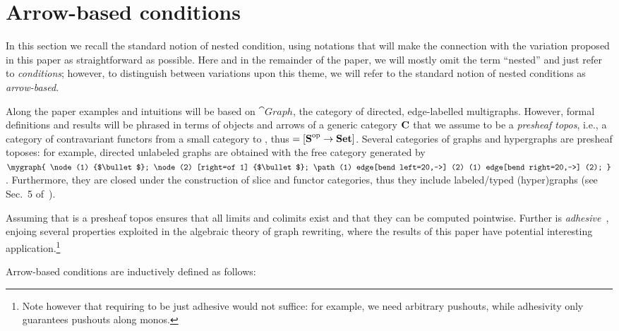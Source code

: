 \section{Arrow-based conditions}

In this section we recall the standard notion of nested condition, using notations that will make the connection with the variation proposed in this paper as straightforward as possible. Here and in the remainder of the paper, we will mostly omit the term ``nested'' and just refer to \emph{conditions}; however, to distinguish between variations upon this theme, we will refer to the standard notion of nested conditions as \emph{arrow-based}.

Along the paper examples and intuitions will be based on $\cat{Graph}$, the category of directed, edge-labelled multigraphs. However, formal definitions and results will be phrased in terms of objects and arrows of a generic category $\mathbf{C}$ that we assume to be a \emph{presheaf topos}, i.e., a category of contravariant functors from a small category  to , thus  $= [\mbox{\textbf{S}}^{\mathrm{op}} \to \textbf{Set}]$. Several categories of graphs and hypergraphs are presheaf toposes: for example, directed unlabeled graphs are obtained with  the free category generated by $\mygraph{
  \node (1) {$\bullet$};
  \node (2) [right=of 1] {$\bullet$};
  \path (1) edge[bend left=20,->] (2)
        (1) edge[bend right=20,->] (2);
}$. Furthermore, they are closed under the construction of slice and functor categories, thus they include labeled/typed (hyper)graphs (see Sec.~5 of~\cite{AzziCR19}). 

Assuming that  is a presheaf topos ensures that all limits and colimits exist and that they can be computed pointwise. Further  is \emph{adhesive}~\cite{ls:adhesive-journal}, enjoing several properties exploited in the algebraic theory of graph rewriting, where the results of this paper have potential interesting application.\footnote{Note however that requiring  to be just adhesive would not suffice: for example, we need arbitrary pushouts, while adhesivity only guarantees pushouts along monos.}

\medskip
Arrow-based conditions are inductively defined as follows:

